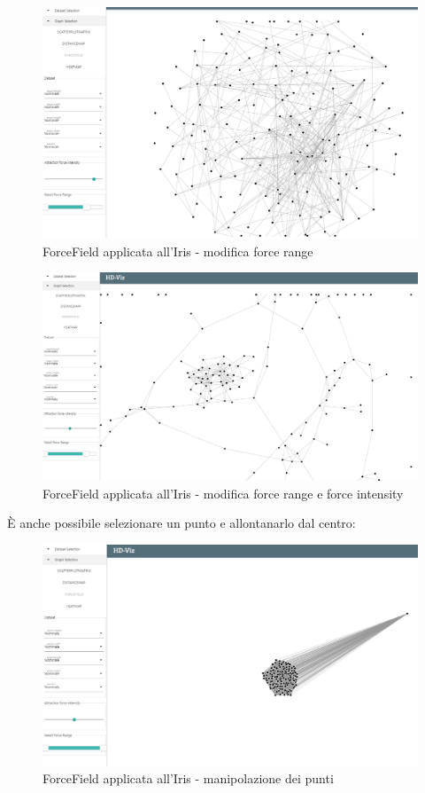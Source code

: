 \documentclass[../manuale_utente.tex]{subfiles}
\begin{document}
\begin{figure}[H]
	\centering
	\includegraphics[width=18cm]{src/img/ff/ff_iris_3}
	\caption{ForceField applicata all'Iris - modifica force range}
\end{figure}

\begin{figure}[H]
	\centering
	\includegraphics[width=18cm]{src/img/ff/ff_iris_4}
	\caption{ForceField applicata all'Iris - modifica force range e force intensity}
\end{figure}

È anche possibile selezionare un punto e allontanarlo dal centro:

\begin{figure}[H]
	\centering
	\includegraphics[width=18cm]{src/img/ff/ff_iris_5}
	\caption{ForceField applicata all'Iris - manipolazione dei punti}
\end{figure}
\end{document}
